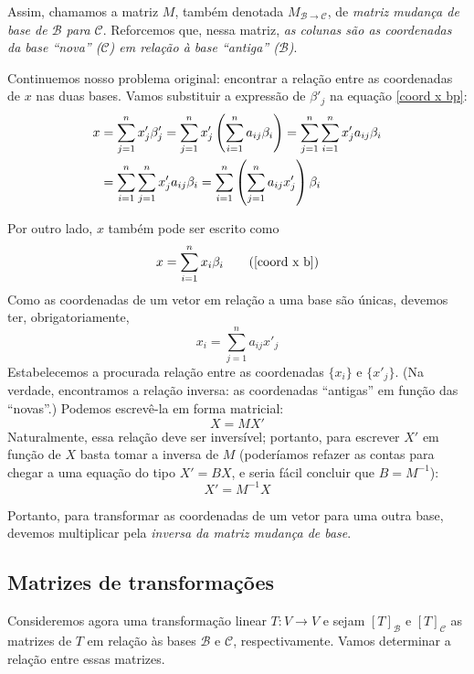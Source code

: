 \documentclass[a4paper,11pt]{article}
\newcommand{\V}{V}
\newcommand{\B}{\mathscr{B}}
\newcommand{\C}{\mathscr{C}}
\begin{document}
Assim, chamamos a matriz $M$, também denotada $M_{\B \to \C}$, de \emph{matriz mudança de base de $\B$ para $\C$}.  Reforcemos que, nessa matriz, \emph{as colunas são as coordenadas da base ``nova'' ($\C$) em relação à base ``antiga'' ($\B$)}.

Continuemos nosso problema original: encontrar a relação entre as coordenadas de $x$ nas duas bases.  Vamos substituir a expressão de $\beta'_j$ na equação \eqref{coord x bp}:
\begin{align}
    x &= \sum_{j=1}^n x'_j \beta'_j
       = \sum_{j=1}^n x'_j \left( \sum_{i=1}^n a_{ij} \beta_i \right)
       = \sum_{j=1}^n \sum_{i=1}^n x'_j a_{ij} \beta_i \notag\\
      &= \sum_{i=1}^n \sum_{j=1}^n x'_j a_{ij} \beta_i
       = \sum_{i=1}^n \left( \sum_{j=1}^n a_{ij} x'_j \right) \beta_i
\end{align}

Por outro lado, $x$ também pode ser escrito como
\[
    x = \sum_{i=1}^n x_i \beta_i 
\tag{\ref{coord x b}}
\]
Como as coordenadas de um vetor em relação a uma base são únicas, devemos ter, obrigatoriamente,
\begin{equation}\label{coord x xp}
    x_i = \sum_{j=1}^n a_{ij} x'_j
\end{equation}
Estabelecemos a procurada relação entre as coordenadas $\{x_i\}$ e $\{x'_j\}$.  (Na verdade, encontramos a relação inversa: as coordenadas ``antigas'' em função das ``novas''.)  Podemos escrevê-la em forma matricial:
\begin{equation}\label{coord x xp m}
    X = MX'
\end{equation}
Naturalmente, essa relação deve ser inversível; portanto, para escrever $X'$ em função de $X$ basta tomar a inversa de $M$ (poderíamos refazer as contas para chegar a uma equação do tipo $X' = BX$, e seria fácil concluir que $B = M^{-1}$):
\begin{equation}\label{coord xp x m}
    X' = M^{-1}X
\end{equation}

Portanto, para transformar as coordenadas de um vetor para uma outra base, devemos multiplicar pela \emph{inversa da matriz mudança de base}.


\subsection*{Matrizes de transformações}

Consideremos agora uma transformação linear $T : \V \to \V$ e sejam $[T]_\B$ e $[T]_\C$ as matrizes de $T$ em relação às bases $\B$ e $\C$, respectivamente.  Vamos determinar a relação entre essas matrizes.
\end{document}
